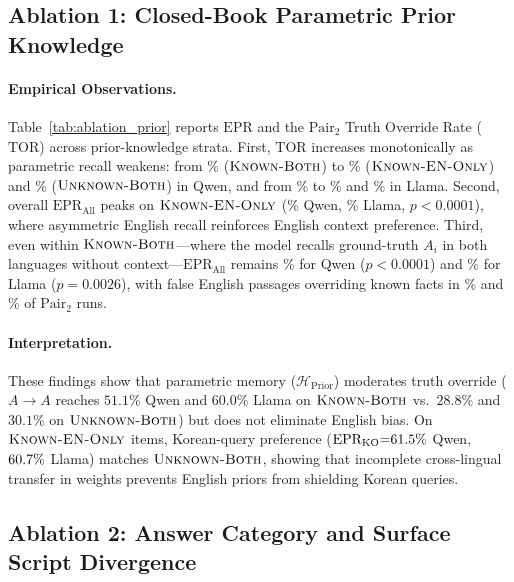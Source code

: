 \subsection{Ablation 1: Closed-Book Parametric Prior Knowledge}
\label{subsec:ablation_prior}

\paragraph{Empirical Observations.}
Table~\ref{tab:ablation_prior} reports $\text{EPR}$ and the $\text{Pair}_2$ Truth Override Rate ($\text{TOR}$) across prior-knowledge strata. First, $\text{TOR}$ increases monotonically as parametric recall weakens: from \qwenPKKnownBothOverrideAll\% ($\textsc{Known-Both}$) to \qwenPKKnownENOnlyOverrideAll\% ($\textsc{Known-EN-Only}$) and \qwenPKUnknownBothOverrideAll\% ($\textsc{Unknown-Both}$) in Qwen, and from \llamaPKKnownBothOverrideAll\% to \llamaPKKnownENOnlyOverrideAll\% and \llamaPKUnknownBothOverrideAll\% in Llama. Second, overall $\text{EPR}_{\text{All}}$ peaks on $\textsc{Known-EN-Only}$ (\qwenPKKnownENOnlyEPRAll\% Qwen, \llamaPKKnownENOnlyEPRAll\% Llama, $p < 0.0001$), where asymmetric English recall reinforces English context preference. Third, even within $\textsc{Known-Both}$---where the model recalls ground-truth $A_i$ in both languages without context---$\text{EPR}_{\text{All}}$ remains \qwenPKKnownBothEPRAll\% for Qwen ($p < 0.0001$) and \llamaPKKnownBothEPRAll\% for Llama ($p{=}0.0026$), with false English passages overriding known facts in \qwenPKKnownBothOverrideAll\% and \llamaPKKnownBothOverrideAll\% of $\text{Pair}_2$ runs.

\paragraph{Interpretation.}
These findings show that parametric memory ($\mathcal{H}_{\text{Prior}}$) moderates truth override ($A \to A$ reaches $51.1\%$ Qwen and $60.0\%$ Llama on $\textsc{Known-Both}$ vs.\ $28.8\%$ and $30.1\%$ on $\textsc{Unknown-Both}$) but does not eliminate English bias. On $\textsc{Known-EN-Only}$ items, Korean-query preference ($\text{EPR}_{\text{KO}}{=}61.5\%$ Qwen, $60.7\%$ Llama) matches $\textsc{Unknown-Both}$, showing that incomplete cross-lingual transfer in weights \citep{qi2023crosslingual,wang2025lost} prevents English priors from shielding Korean queries.

\subsection{Ablation 2: Answer Category and Surface Script Divergence}
\label{subsec:ablation_category}

